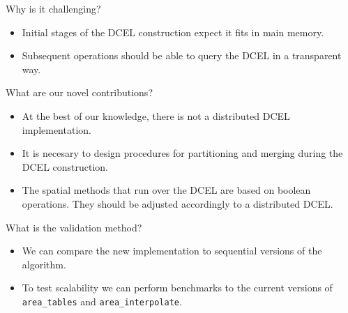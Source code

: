 \documentclass{beamer}
\begin{document}
\begin{frame}{Why is it challenging?}
    \begin{itemize}
        \item Initial stages of the DCEL construction expect it fits in main memory.
        \item Subsequent operations should be able to query the DCEL in a transparent way.
    \end{itemize}
\end{frame}

\begin{frame}{What are our novel contributions?}
    \begin{itemize}
        \item At the best of our knowledge, there is not a distributed DCEL implementation.
        \item It is necesary to design procedures for partitioning and merging during the DCEL construction.
        \item The spatial methods that run over the DCEL are based on boolean operations.  They should be adjusted accordingly to a distributed DCEL.
    \end{itemize}
\end{frame}

\begin{frame}{What is the validation method?}
    \begin{itemize}
        \item We can compare the new implementation to sequential versions of the algorithm.
        \item To test scalability we can perform benchmarks to the current versions of \texttt{area\_tables} and \texttt{area\_interpolate}.
    \end{itemize}
\end{frame}
\end{document}
